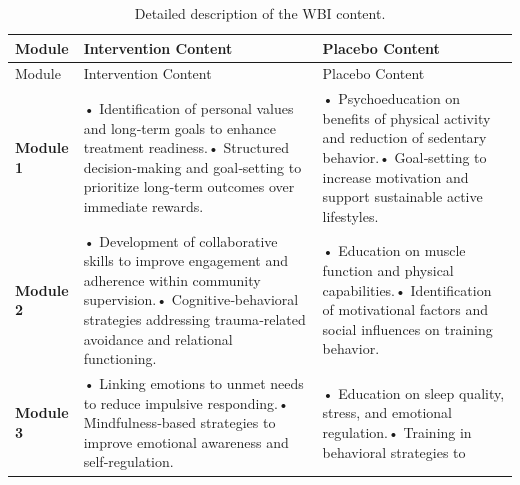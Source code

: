 \documentclass[
  super,
  preprint,
  1p,
  onecolumn]{elsarticle}
\begin{document}
\begin{longtable}[]{@{}
  >{\raggedright\arraybackslash}p{}
  >{\raggedright\arraybackslash}p{}
  >{\raggedright\arraybackslash}p{}@{}}
\caption{Detailed description of the WBI
content.}\label{tbl-module-content}\tabularnewline
\toprule\noalign{}
\begin{minipage}[b]{\linewidth}\raggedright
Module
\end{minipage} & \begin{minipage}[b]{\linewidth}\raggedright
Intervention Content
\end{minipage} & \begin{minipage}[b]{\linewidth}\raggedright
Placebo Content
\end{minipage} \\
\midrule\noalign{}
\endfirsthead
\toprule\noalign{}
\begin{minipage}[b]{\linewidth}\raggedright
Module
\end{minipage} & \begin{minipage}[b]{\linewidth}\raggedright
Intervention Content
\end{minipage} & \begin{minipage}[b]{\linewidth}\raggedright
Placebo Content
\end{minipage} \\
\midrule\noalign{}
\endhead
\bottomrule\noalign{}
\endlastfoot
\textbf{Module 1} & • Identification of personal values and long‑term
goals to enhance treatment readiness.• Structured decision‑making and
goal‑setting to prioritize long‑term outcomes over immediate rewards. &
• Psychoeducation on benefits of physical activity and reduction of
sedentary behavior.• Goal‑setting to increase motivation and support
sustainable active lifestyles. \\
\textbf{Module 2} & • Development of collaborative skills to improve
engagement and adherence within community supervision.•
Cognitive‑behavioral strategies addressing trauma‑related avoidance and
relational functioning. & • Education on muscle function and physical
capabilities.• Identification of motivational factors and social
influences on training behavior. \\
\textbf{Module 3} & • Linking emotions to unmet needs to reduce
impulsive responding.• Mindfulness‑based strategies to improve emotional
awareness and self‑regulation. & • Education on sleep quality, stress,
and emotional regulation.• Training in behavioral strategies to

\end{longtable}
\end{document}
